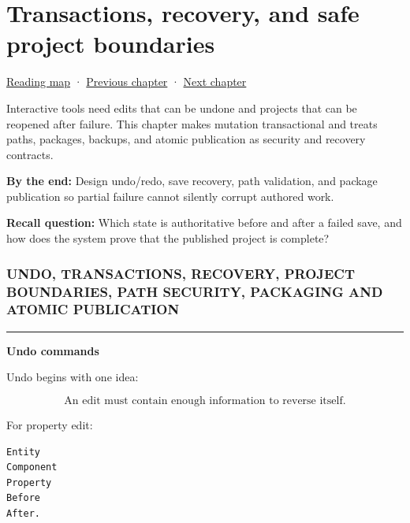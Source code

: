 \chapter{Transactions, recovery, and safe project boundaries}\label{05-engine-i-ch012-transactions-recovery-and-safe-project-boundaries}\hypertarget{05-engine-i-ch012}{}\label{stagechapter:05-engine-i-ch012}

\hypertarget{05-engine-i-ch012-transactions-recovery-and-safe-project-boundaries}{}

\hyperref[volume-reading-map]{Reading map} · \hyperref[05-engine-i-ch011-streaming-resources-through-explicit-states]{Previous chapter} · \hyperref[06-engine-ii-ch041]{Next chapter}

Interactive tools need edits that can be undone and projects that can be reopened after failure. This chapter makes mutation transactional and treats paths, packages, backups, and atomic publication as security and recovery contracts.

\textbf{By the end:} Design undo/redo, save recovery, path validation, and package publication so partial failure cannot silently corrupt authored work.

\textbf{Recall question:} Which state is authoritative before and after a failed save, and how does the system prove that the published project is complete?

\subsection{UNDO, TRANSACTIONS, RECOVERY, PROJECT BOUNDARIES, PATH SECURITY, PACKAGING AND ATOMIC PUBLICATION}\label{05-engine-i-ch012-undo-transactions-recovery-project-boundaries-path-security-packaging-and-atomic-publication}

\hypertarget{05-engine-i-ch012-undo-transactions-recovery-project-boundaries-path-security-packaging-and-atomic-publication}{}

\begin{center}\rule{0.5\linewidth}{0.5pt}\end{center}

\textbf{Undo commands}

Undo begins with one idea:

\[
\boxed{
\text{An edit must contain enough information to reverse itself.}
}
\]

For property edit:

\begin{verbatim}
Entity
Component
Property
Before
After.
\end{verbatim}

